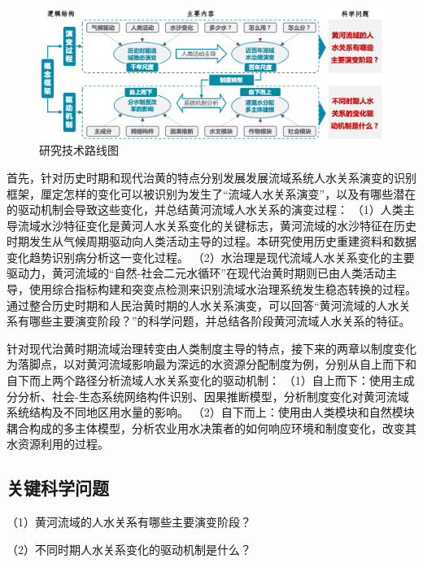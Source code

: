\begin{figure}[htb] %
    \includegraphics[width=\textwidth]{img/ch1/ch1_workflow.png}
    \caption{研究技术路线图}\label{ch1:fig:workflow}
\end{figure}

首先，针对历史时期和现代治黄的特点分别发展发展流域系统人水关系演变的识别框架，厘定怎样的变化可以被识别为发生了“流域人水关系演变”，以及有哪些潜在的驱动机制会导致这些变化，并总结黄河流域人水关系的演变过程：
（1）人类主导流域水沙特征变化是黄河人水关系变化的关键标志，黄河流域的水沙特征在历史时期发生从气候周期驱动向人类活动主导的过程。本研究使用历史重建资料和数据变化趋势识别病分析这一变化过程。
（2）水治理是现代流域人水关系变化的主要驱动力，黄河流域的“自然-社会二元水循环”在现代治黄时期则已由人类活动主导，使用综合指标构建和突变点检测来识别流域水治理系统发生稳态转换的过程。
通过整合历史时期和人民治黄时期的人水关系演变，可以回答“黄河流域的人水关系有哪些主要演变阶段？”的科学问题，并总结各阶段黄河流域人水关系的特征。

针对现代治黄时期流域治理转变由人类制度主导的特点，接下来的两章以制度变化为落脚点，以对黄河流域影响最为深远的水资源分配制度为例，分别从自上而下和自下而上两个路径分析流域人水关系变化的驱动机制：
（1）自上而下：使用主成分分析、社会-生态系统网络构件识别、因果推断模型，分析制度变化对黄河流域系统结构及不同地区用水量的影响。
（2）自下而上：使用由人类模块和自然模块耦合构成的多主体模型，分析农业用水决策者的如何响应环境和制度变化，改变其水资源利用的过程。

\subsection{关键科学问题}

（1）黄河流域的人水关系有哪些主要演变阶段？

（2）不同时期人水关系变化的驱动机制是什么？
